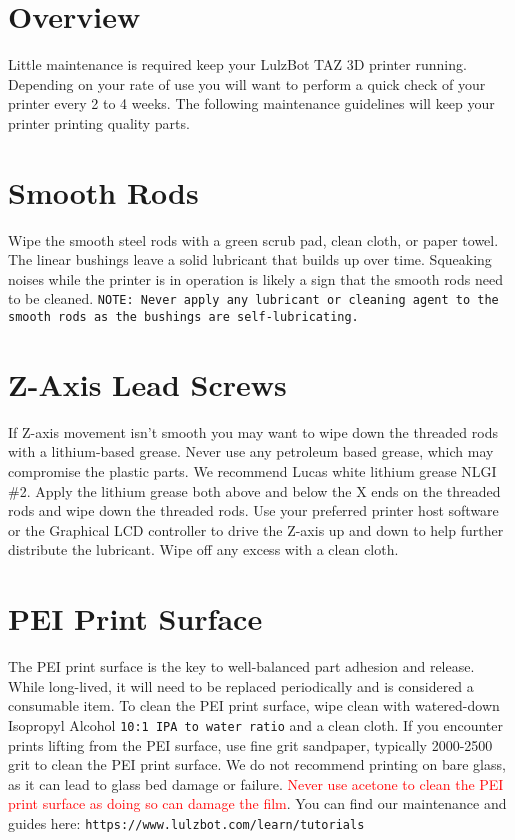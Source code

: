 %
%
%
%
%

\section{Overview}
Little maintenance is required keep your LulzBot TAZ 3D printer running. Depending on your rate of use you will want to perform a quick check of your printer every 2 to 4 weeks. The following maintenance guidelines will keep your printer printing quality parts.

\section{Smooth Rods}
Wipe the smooth steel rods with a green scrub pad, clean cloth, or paper towel. The linear bushings leave a solid lubricant that builds up over time. Squeaking noises while the printer is in operation is likely a sign that the smooth rods need to be cleaned. \texttt{NOTE: Never apply any lubricant or cleaning agent to the smooth rods as the bushings are self-lubricating.}


\section{Z-Axis Lead Screws}
If Z-axis movement isn't smooth you may want to wipe down the threaded rods with a lithium-based grease. Never use any petroleum based grease, which may compromise the plastic parts. We recommend Lucas white lithium grease NLGI \#2. Apply the lithium grease both above and below the X ends on the threaded rods and wipe down the threaded rods. Use your preferred printer host software or the Graphical LCD controller to drive the Z-axis up and down to help further distribute the lubricant. Wipe off any excess with a clean cloth.

\section{PEI Print Surface}
The PEI print surface is the key to well-balanced part adhesion and release. While long-lived, it will need to be replaced periodically and is considered a consumable item. To clean the PEI print surface, wipe clean with watered-down Isopropyl Alcohol \texttt{10:1 IPA to water ratio} and a clean cloth. If you encounter prints lifting from the PEI surface, use fine grit sandpaper, typically 2000-2500 grit to clean the PEI print surface. We do not recommend printing on bare glass, as it can lead to glass bed damage or failure. \textcolor{red}{Never use acetone to clean the PEI print surface as doing so can damage the film}. You can find our maintenance and guides here:
\texttt{https://www.lulzbot.com/learn/tutorials}

